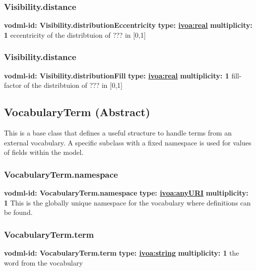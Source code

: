     \subsubsection{Visibility.distance}
      \textbf{vodml-id: Visibility.distributionEccentricity} \newline
      \textbf{type: \hyperref[sect:ivoa]{ivoa:real}} \newline
      \textbf{multiplicity: 1} \newline
      eccentricity of the distribtuion of ??? in [0,1]

    \subsubsection{Visibility.distance}
      \textbf{vodml-id: Visibility.distributionFill} \newline
      \textbf{type: \hyperref[sect:ivoa]{ivoa:real}} \newline
      \textbf{multiplicity: 1} \newline
      fill-factor of the distribtuion of ??? in [0,1]

  \subsection{VocabularyTerm (Abstract)}
  \label{sect:VocabularyTerm}
    This is a base class that defines a useful structure to handle terms from an external vocabulary. A specific subclass with a fixed namespace is used for values of fields within the model. 

    \subsubsection{VocabularyTerm.namespace}
      \textbf{vodml-id: VocabularyTerm.namespace} \newline
      \textbf{type: \hyperref[sect:ivoa]{ivoa:anyURI}} \newline
      \textbf{multiplicity: 1} \newline
      This is the globally unique namespace for the vocabulary where definitions can be found.

    \subsubsection{VocabularyTerm.term}
      \textbf{vodml-id: VocabularyTerm.term} \newline
      \textbf{type: \hyperref[sect:ivoa]{ivoa:string}} \newline
      \textbf{multiplicity: 1} \newline
      the word from the vocabulary

